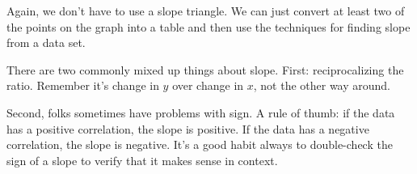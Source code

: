 \begin{center}
\begin{minipage}{0.32\textwidth}
%
\end{minipage}
\end{center}

Again, we don't have to use a slope triangle. We can just convert at least two of the points on the graph into a table and then use the techniques for finding slope from a data set.

There are two commonly mixed up things about slope. First: reciprocalizing the ratio. Remember it's change in $y$ over change in $x$, not the other way around.

Second, folks sometimes have problems with sign. A rule of thumb: if the data has a positive correlation, the slope is positive. If the data has a negative correlation, the slope is negative. It's a good habit always to double-check the sign of a slope to verify that it makes sense in context.

